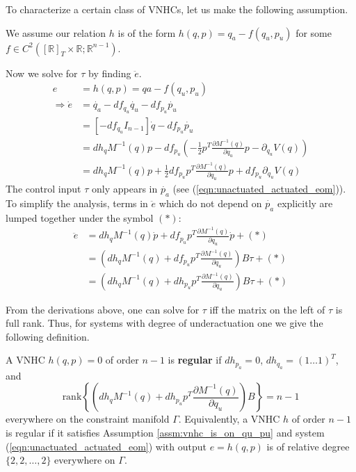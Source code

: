 To characterize a certain class of VNHCs, let us make the following assumption.
\begin{assm}\label{assm:vnhc_is_on_qu_pu}
We assume our relation \(h\) is of the form \(h(q,p) = q_a - f(q_u,p_u)\) for some \(f \in C^2\left([\mathbb{R}]_T \times \mathbb{R} ; \mathbb{R}^{n - 1}\right)\).
\end{assm}

Now we solve for \(\tau\) by finding \(\ddot{e}\).
\begin{align*}
    e &= h(q,p) = qa - f(q_u,p_u)\\
    \Rightarrow \dot{e} &= \dot{q_a} - df_{q_u}\dot{q_u} -df_{p_u}\dot{p_u} \\
    &= [-df_{q_u} I_{n-1}]\dot{q} - df_{p_u} \dot{p_u} \\
    &= dh_q M^{-1}(q) p - df_{p_u}\left( -\frac{1}{2}p^T \frac{\partial M^{-1}(q)}{\partial q_u} p - \partial_{q_u}V(q) \right) \\
    &= dh_q M^{-1}(q) p + \frac{1}{2}df_{p_u} p^T \frac{\partial M^{-1}(q)}{\partial q_u} p + df_{p_u}\partial_{q_u}V(q)
\end{align*}
The control input \(\tau\) only appears in \(\dot{p_a}\) (see (\ref{eqn:unactuated_actuated_eom})). To simplify the analysis, terms in \(\ddot{e}\) which do not depend on \(\dot{p_a}\) explicitly are lumped together under the symbol \((*)\):
\begin{align*}
    \ddot{e} &= dh_q M^{-1}(q) \dot{p} + df_{p_u} p^T \frac{\partial M^{-1}(q)}{\partial q_u} \dot{p} + (*) \\
    &= (dh_q M^{-1}(q) + df_{p_u} p^T \frac{\partial M^{-1}(q)}{\partial q_u})B\tau + (*) \\
    &= (dh_q M^{-1}(q) + dh_{p_u} p^T \frac{\partial M^{-1}(q)}{\partial q_u})B\tau + (*)
\end{align*}

From the derivations above, one can solve for \(\tau\) iff the matrix on the left of \(\tau\) is full rank. Thus, for systems with degree of underactuation one we give the following definition.
\begin{defn}
A VNHC \(h(q,p) = 0\) of order \(n - 1\) is \textbf{regular} if \(dh_{p_a} = 0\), \(dh_{q_a} = (1 \ldots 1)^T\), and 
\[
\text{rank}\left\{ (dh_q M^{-1}(q) + dh_{p_u} p^T \frac{\partial M^{-1}(q)}{\partial q_u})B\right\} = n - 1
\]
everywhere on the constraint manifold \(\Gamma\). Equivalently, a VNHC \(h\) of order \(n - 1\) is regular if it satisfies Assumption \ref{assm:vnhc_is_on_qu_pu} and system (\ref{eqn:unactuated_actuated_eom}) with output \(e = h(q,p)\) is of relative degree \(\{2,2,\ldots,2\}\) everywhere on \(\Gamma\).
\end{defn}

